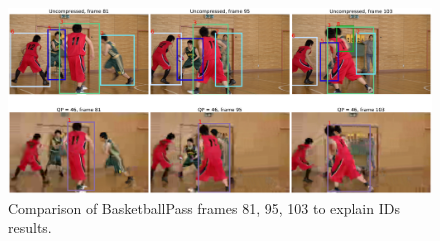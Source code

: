 \begin{figure}[!tb]
  \centering
  \includegraphics[width=1.0\linewidth]{img/BasketballPass_0_IDs.pdf}
  \caption[Comparison of BasketballPass frames 81, 95, 103 to explain IDs results]
  {
  Comparison of BasketballPass frames 81, 95, 103 to explain IDs results.
  }
  \label{fig:BasketballPass_0_IDs}
\end{figure}